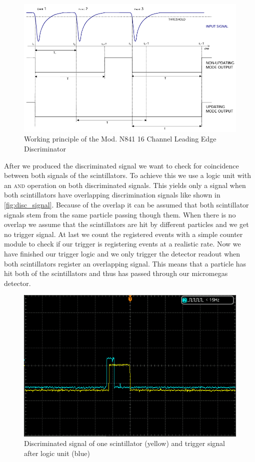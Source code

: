 \documentclass[sn-mathphys-num,iicol]{sn-jnl}
\theoremstyle{thmstyleone}
\theoremstyle{thmstyletwo}
\theoremstyle{thmstylethree}
\begin{document}
\begin{figure}
  \includegraphics[width=\linewidth]{figures/discriminator.png}
  \caption{Working principle of the Mod. N841 16 Channel Leading Edge Discriminator}
  \label{fig:discriminator}
\end{figure}

After we produced the discriminated signal we want to check for coincidence between both signals of the scintillators.
To achieve this we use a logic unit with an \textsc{and} operation on both discriminated signals.
This yields only a signal when both scintillators have overlapping discrimination signals like shown in \autoref{fig:disc_signal}.
Because of the overlap it can be assumed that both scintillator signals stem from the same particle passing though them.
When there is no overlap we assume that the scintillators are hit by different particles and we get no trigger signal.
At last we count the registered events with a simple counter module to check if our trigger is registering events at a realistic rate.
Now we have finished our trigger logic and we only trigger the detector readout when both scintillators register an overlapping signal.
This means that a particle has hit both of the scintillators and thus has passed through our micromegas detector.

\begin{figure}
  \includegraphics[width=\linewidth]{figures/DS1Z_QuickPrint2_cropped.png}
  \caption{Discriminated signal of one scintillator (yellow) and trigger signal after logic unit (blue)}
  \label{fig:disc_signal}
\end{figure}
\end{document}
